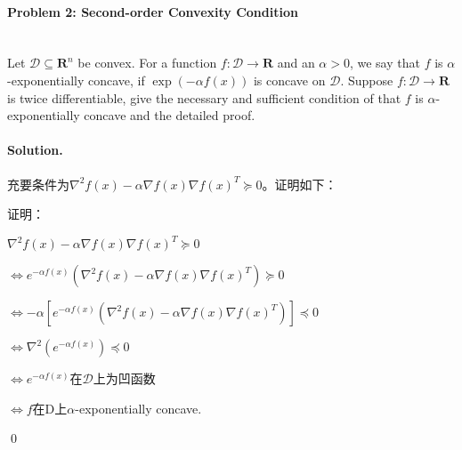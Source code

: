 \documentclass[a4paper]{article}
\newenvironment{solution}
{\color{blue} \paragraph{Solution.}}
{\newline \qed}
\begin{document}
\paragraph{Problem 2: Second-order Convexity Condition}
~\\
Let $\mathcal{D}\subseteq\mathbf{R}^n$ be convex. For a function $f:\mathcal{D}\to\mathbf{R}$ and an $\alpha>0$, we say that $f$ is $\alpha$-exponentially concave, if $\exp(-\alpha f(x))$ is concave on $\mathcal{D}$. Suppose $f:\mathcal{D}\to\mathbf{R}$ is twice differentiable, give the necessary and sufficient condition of that $f$ is $\alpha$-exponentially concave and the detailed proof.
\begin{solution}
    
    充要条件为$\nabla^2f(x)-\alpha\nabla f(x)\nabla f(x)^T\succcurlyeq 0$。证明如下：

    证明：
    
    $\nabla^2f(x)-\alpha\nabla f(x)\nabla f(x)^T\succcurlyeq 0$

    $\Leftrightarrow e^{-\alpha f(x)}(\nabla^2f(x)-\alpha\nabla f(x)\nabla f(x)^T) \succcurlyeq 0$

    $\Leftrightarrow -\alpha\left[e^{-\alpha f(x)}(\nabla^2f(x)-\alpha\nabla f(x)\nabla f(x)^T)\right] \preccurlyeq 0$

    $\Leftrightarrow \nabla^2(e^{-\alpha f(x)})\preccurlyeq 0$

    $\Leftrightarrow e^{-\alpha f(x)}$在$\mathcal{D}$上为凹函数

    $\Leftrightarrow f$在D上$\alpha$-exponentially concave.

\end{solution}
\end{document}

